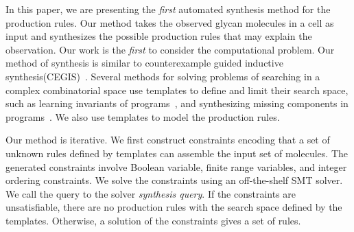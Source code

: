 In this paper, we are presenting the {\em first} automated synthesis
method for the production rules.
Our method takes the observed glycan molecules in a cell as input and synthesizes
the possible production rules that may explain the observation.
Our work is the {\em first} to consider the computational problem.
Our method of synthesis is similar to counterexample guided
inductive synthesis(CEGIS)~\cite{cegis}.
Several methods for solving problems of searching in a complex combinatorial
space use templates to define and limit their search space,
such as learning invariants of programs~\cite{InvGenTACAS09},
and synthesizing missing components in programs~\cite{sygus,Solar-Lezama2005}.
We also use templates to model the production rules.


Our method is iterative.
We first construct constraints encoding that a set of unknown rules
defined by templates can assemble the input set of molecules.
The generated constraints involve Boolean variable, finite range variables, and integer ordering
constraints.
We solve the constraints using an off-the-shelf SMT solver.
We call the query to the solver {\em synthesis query}.
If the constraints are unsatisfiable, there are no production rules with the search space
defined by the templates.
Otherwise, a solution of the constraints gives a set of rules.

